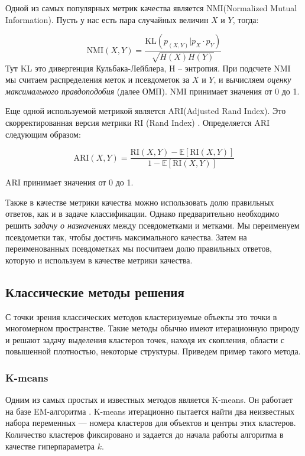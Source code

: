 \documentclass[a4paper,12pt]{extarticle}
\begin{document}
Одной из самых популярных метрик качества является NMI(Normalized Mutual \\
Information).
Пусть у нас есть пара случайных величин $X$ и $Y$, тогда:

\[
	\text{NMI}(X,Y) = \frac{\text{KL}(p_{(X, Y)}| p_X \cdot p_Y)}{\sqrt{H(X)H(Y)}}
\]
Тут KL это дивергенция Кульбака-Лейблера, H -- энтропия.
При подсчете NMI мы считаем распределения меток и псевдометок 
за $X$ и $Y$, и вычисляем \textit{оценку максимального правдоподобия} (далее ОМП). NMI 
принимает значения от 0 до 1.

Еще одной используемой метрикой является ARI(Adjusted Rand Index).
Это скорректированная версия метрики RI (Rand Index) \cite{rand1971objective}.
Определяется ARI следующим образом:

\[
	\text{ARI}(X, Y) = \frac{\text{RI}(X, Y) - \mathds{E}[\text{RI}(X, Y)]}{1 - \mathds{E}[\text{RI}(X, Y)]}
\]

ARI принимает значения от 0 до 1.

Также в качестве метрики качества можно использовать долю 
правильных ответов, как и в задаче классификации. Однако предварительно 
необходимо решить \textit{задачу о назначениях} \cite{assignment_problem}
между псевдометками и метками.
Мы переименуем псевдометки так, чтобы достичь максимального качества.
Затем на переименованных псевдометках мы посчитаем долю правильных ответов, которую 
и используем в качестве метрики качества.

\subsection{Классические методы решения}

С точки зрения классических методов кластеризуемые
объекты это точки в многомерном пространстве. Такие
методы обычно имеют итерационную природу и решают 
задачу выделения кластеров точек, находя их скопления, 
области с повышенной плотностью, некоторые структуры.
Приведем пример такого метода.

\subsubsection{K-means}

Одним из самых простых и известных методов является
K-means. Он работает на базе EM-алгоритма \cite{dempster1977maximum}.
K-means итерационно пытается найти два неизвестных набора переменных ---
номера кластеров для объектов и центры этих кластеров. 
Количество кластеров фиксировано и задается до начала 
работы алгоритма в качестве гиперпараметра $k$.
\end{document}
